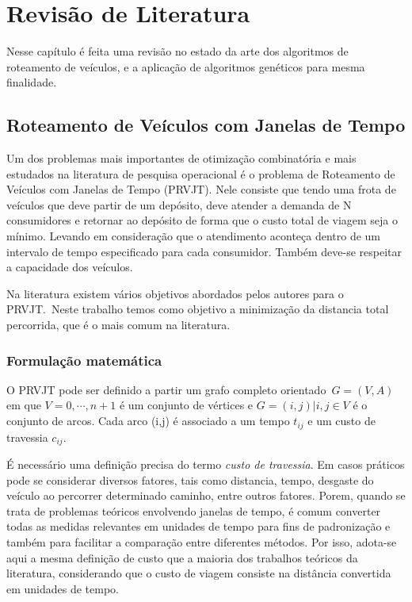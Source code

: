 \chapter[Revisão de Literatura]{Revisão de Literatura}


Nesse capítulo é feita uma revisão no estado da arte dos algoritmos de roteamento de veículos, e a aplicação de algoritmos genéticos para mesma finalidade.

\section{Roteamento de Veículos com Janelas de Tempo}

Um dos problemas mais importantes de otimização combinatória e mais estudados na literatura de pesquisa operacional é o problema de Roteamento de Veículos com Janelas de Tempo (PRVJT).
Nele consiste que tendo uma frota de veículos que deve partir de um depósito, deve atender a demanda de N consumidores e retornar ao depósito de forma que o custo total de viagem seja o mínimo. Levando em consideração que o atendimento aconteça dentro de um intervalo de tempo especificado para cada consumidor. Também deve-se respeitar a capacidade dos veículos.

Na literatura existem vários objetivos abordados pelos autores para o PRVJT.\ Neste trabalho temos como objetivo a minimização da distancia total percorrida, que é o mais comum na literatura.~\cite{ROCHAT}

\subsection{Formulação matemática}

O PRVJT pode ser definido a partir um grafo completo orientado~\(G = (V,A)\) em que \(V = {0,\cdots,n+1}\) é um conjunto de vértices e \(G ={(i,j)|i,j \in V}\) é o conjunto de arcos.
Cada arco (i,j) é associado a um tempo \(t_{ij}\) e um custo de travessia \(c_{ij}\).

É necessário uma definição precisa do termo \textit{custo de travessia}. Em casos práticos pode se considerar diversos fatores, tais como distancia, tempo, desgaste do veículo ao percorrer determinado caminho, entre outros fatores. Porem, quando se trata de problemas teóricos envolvendo janelas de tempo, é comum converter todas as medidas relevantes em unidades de tempo para fins de padronização e também para facilitar a comparação entre diferentes métodos. Por isso, adota-se aqui a mesma definição de custo que a maioria dos trabalhos teóricos da literatura, considerando que o custo de viagem consiste na distância convertida em unidades de tempo.

